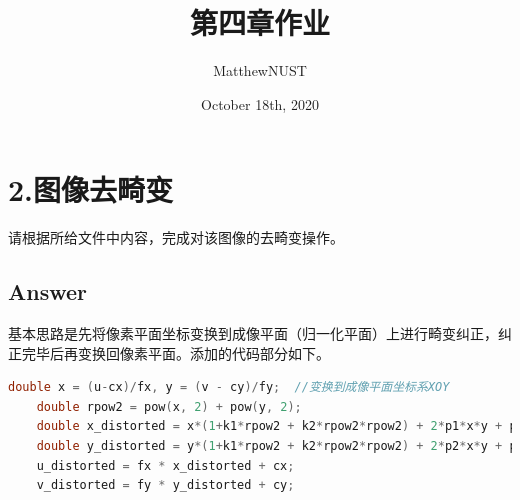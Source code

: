 \documentclass[
	12pt, %
]{fphw} %
\title{第四章作业} %
\author{MatthewNUST} %
\date{October 18th, 2020} %
\institute{深蓝学院 \\ 视觉SLAM} %
\begin{document}
\maketitle %


\section*{2.图像去畸变}

\begin{problem}
	请根据所给文件中内容，完成对该图像的去畸变操作。
\end{problem}

\subsection*{Answer}

基本思路是先将像素平面坐标变换到成像平面（归一化平面）上进行畸变纠正，纠正完毕后再变换回像素平面。添加的代码部分如下。
\begin{lstlisting}[language=C++, caption=题2所添代码]
	double x = (u-cx)/fx, y = (v - cy)/fy;	//变换到成像平面坐标系XOY
	double rpow2 = pow(x, 2) + pow(y, 2);
	double x_distorted = x*(1+k1*rpow2 + k2*rpow2*rpow2) + 2*p1*x*y + p2*(rpow2 + 2*x*x);
	double y_distorted = y*(1+k1*rpow2 + k2*rpow2*rpow2) + 2*p2*x*y + p1*(rpow2 + 2*y*y);
	u_distorted = fx * x_distorted + cx;
	v_distorted = fy * y_distorted + cy;	
\end{lstlisting}
\end{document}
